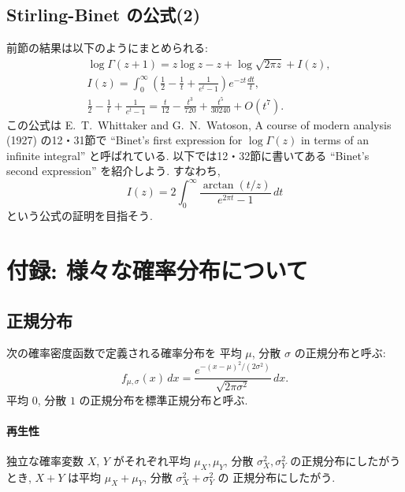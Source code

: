 \documentclass[12pt,twoside]{jarticle}
\theoremstyle{jplain}
\theoremstyle{jplain}
\theoremstyle{jplain}
\numberwithin{theorem}{section}
\numberwithin{equation}{section}
\numberwithin{figure}{section}
\numberwithin{table}{section}
\begin{document}
\subsection{Stirling-Binet の公式(2)}
\label{sec:Binet2}

前節の結果は以下のようにまとめられる:
\begin{align*}
&
\log\Gamma(z+1)=z\log z-z+\log\sqrt{2\pi z}+I(z), 
\\ &
I(z)=\int_0^\infty\left(\frac{1}{2}-\frac{1}{t}+\frac{1}{e^t-1}\right)e^{-zt}\frac{dt}{t},
\\ &
\frac{1}{2}-\frac{1}{t}+\frac{1}{e^t-1}
=\frac{t}{12}-\frac{t^3}{720}+\frac{t^5}{30240}+O(t^7).
\end{align*}
この公式は E.~T.~Whittaker and G.~N.~Watoson, A course of modern analysis (1927)
の12・31節で ``Binet's first expression for $\log\Gamma(z)$ in terms of an infinite integral''
と呼ばれている. 以下では12・32節に書いてある ``Binet's second expression'' を紹介しよう.
すなわち, 
\[
I(z)=2\int_0^\infty \frac{\arctan(t/z)}{e^{2\pi t}-1}\,dt
\]
という公式の証明を目指そう.

\bigskip


\section{付録: 様々な確率分布について}
\label{sec:dists}








\subsection{正規分布}
\label{sec:normal}

次の確率密度函数で定義される確率分布を
平均 $\mu$, 分散 $\sigma$ の正規分布と呼ぶ:
\[
f_{\mu,\sigma}(x)\,dx
=\frac{e^{-(x-\mu)^2/(2\sigma^2)}}{\sqrt{2\pi \sigma^2}}\,dx.
\]
平均 $0$, 分散 $1$ の正規分布を標準正規分布と呼ぶ.

\paragraph{再生性} 
独立な確率変数 $X$, $Y$ がそれぞれ平均 $\mu_X,\mu_Y$, 分散 $\sigma_X^2,\sigma_Y^2$
の正規分布にしたがうとき, $X+Y$ は平均 $\mu_X+\mu_Y$, 分散 $\sigma_X^2+\sigma_Y^2$ の
正規分布にしたがう.
\end{document}
